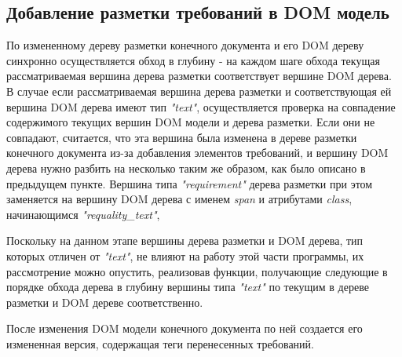 \subsection{Добавление разметки требований в DOM модель}

По измененному дереву разметки конечного документа и его DOM дереву синхронно осуществляется обход в глубину - на каждом шаге обхода текущая рассматриваемая вершина дерева разметки соответствует вершине DOM дерева. В случае если рассматриваемая вершина дерева разметки и соответствующая ей вершина DOM дерева имеют тип \emph{"text"}, осуществляется проверка на совпадение содержимого текущих вершин DOM модели и дерева разметки. Если они не совпадают, считается, что эта вершина была изменена в дереве разметки конечного документа из-за добавления элементов требований, и вершину DOM дерева нужно разбить \cite{book:JDOM} на несколько таким же образом, как было описано в предыдущем пункте. Вершина типа \emph{"requirement"} дерева разметки при этом заменяется на вершину DOM дерева с именем \emph{span} и атрибутами \emph{class}, начинающимся \emph{"requality\_text"},  

Поскольку на данном этапе вершины дерева разметки и DOM дерева, тип которых отличен от \emph{"text"}, не влияют на работу этой части программы, их рассмотрение можно опустить, реализовав функции, получающие следующие в порядке обхода дерева в глубину вершины типа \emph{"text"} по текущим в дереве разметки и DOM дереве соответственно. 

После изменения DOM модели конечного документа по ней создается его измененная версия, содержащая теги перенесенных требований. 